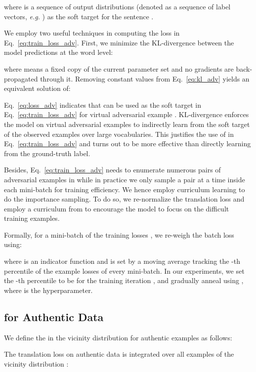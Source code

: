 \documentclass[11pt,a4paper]{article}
\newcommand{\eg}{\emph{e.g. }} \newcommand{\Eg}{\emph{E.g}}
\begin{document}
where  is a sequence of output distributions (denoted as a sequence of label vectors, \eg ) as the soft target for the sentence . 


We employ two useful techniques in computing the loss  in Eq.~\eqref{eq:train_loss_adv}. First, we minimize the KL-divergence between the model predictions at the word level:

where  means a fixed copy of the current parameter set and no gradients are back-propagated through it. Removing constant values from Eq.~\eqref{eq:kl_adv} yields an equivalent solution of:

Eq.~\eqref{eq:loss_adv} indicates that  can be used as the soft target  in Eq.~\eqref{eq:train_loss_adv} for virtual adversarial example .
KL-divergence enforces the model on virtual adversarial examples to indirectly learn from the soft target of the observed examples over large vocabularies. This justifies the use of  in Eq.~\eqref{eq:train_loss_adv} and turns out to be more effective than directly learning from the ground-truth label.

Besides, Eq.~\eqref{eq:train_loss_adv} needs to enumerate numerous pairs of adversarial examples in  while in practice we only sample a pair at a time inside each mini-batch for training efficiency.
We hence employ curriculum learning to do the importance sampling. To do so, we re-normalize the translation loss and employ a curriculum from \cite{jiang2017mentornet} to encourage the model to focus on the difficult training examples. 

Formally, for a mini-batch of the training losses , we re-weigh the batch loss using:

where  is an indicator function and  is set by a moving average tracking the -th percentile of the example losses of every mini-batch. In our experiments, we set the -th percentile to be  for the training iteration , 
and gradually anneal  using , where  is the hyperparameter.
\subsection{ for Authentic Data}
We define the   in the vicinity distribution  for authentic examples as follows:



The translation loss on authentic data is integrated over all examples of the vicinity distribution :
\end{document}
